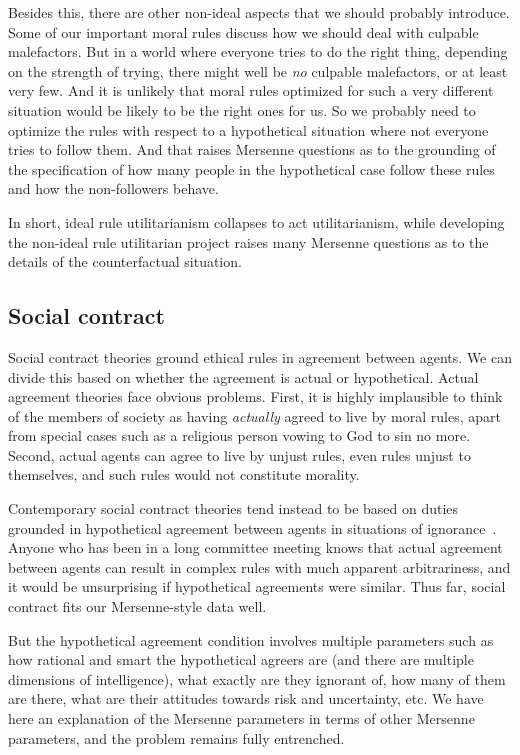 Besides this, there are other non-ideal aspects that we should probably introduce. Some of our important moral rules discuss how
we should deal with culpable malefactors. But in a world where everyone tries to do the right thing, depending on the strength
of trying, there might well be \textit{no} culpable malefactors, or at least very few. And it is unlikely that moral rules optimized
for such a very different situation would be likely to be the right ones for us. So we probably need to optimize the rules with
respect to a hypothetical situation where not everyone tries to follow them. And that raises Mersenne questions as to 
the grounding of the specification of how many
people in the hypothetical case follow these rules and how the non-followers behave.

In short, ideal rule utilitarianism collapses to act utilitarianism, while developing the non-ideal rule utilitarian project raises many Mersenne questions as to the details of the counterfactual situation.

\subsection{Social contract}
Social contract theories ground ethical rules in agreement between agents.  We can divide this based on whether the agreement 
is actual or hypothetical. Actual agreement theories face obvious problems. First, it is highly implausible to think of the members of society as having \textit{actually} agreed to live by moral rules, apart from special cases such as a religious person vowing to God to sin no more. Second, actual agents can agree to live by unjust rules, even rules unjust to themselves,
and such rules would not constitute morality. 

Contemporary social contract theories tend instead to be based on duties grounded in hypothetical agreement between agents in situations of 
ignorance~\parencite{RawlsJustice}. Anyone who has been in a long committee meeting knows that actual agreement between agents can result in 
complex rules with much apparent arbitrariness, and it would be unsurprising if hypothetical agreements were similar. Thus far, 
social contract fits our Mersenne-style data well. 

But the hypothetical agreement condition involves multiple parameters such as how rational and smart the hypothetical agreers are (and there are
multiple dimensions of intelligence), what exactly are they ignorant of, how many of them are there, what are their attitudes towards
risk and uncertainty, etc. 
We have here an explanation of the Mersenne parameters in terms of other Mersenne parameters, and the
problem remains fully entrenched. 

